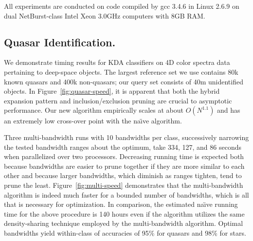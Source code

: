 \documentclass[twoside,leqno,twocolumn]{article}
\begin{document}
All experiments are conducted on code compiled by gcc 3.4.6 in Linux
2.6.9 on dual NetBurst-class Intel Xeon 3.0GHz computers with 8GB RAM.

\subsection{Quasar Identification.}
We demonstrate timing results for KDA classifiers on 4D color spectra
data pertaining to deep-space objects.  The largest reference set we
use contains 80k known quasars and 400k non-quasars; our query set
consists of 40m unidentified objects.  In
Figure~\ref{fig:quasar-speed}, it is apparent that both the hybrid
expansion pattern and inclusion/exclusion pruning are crucial to
asymptotic performance.  Our new algorithm empirically scales at about
$O(N^{1.1})$ and has an extremely low cross-over point with the
na\"{\i}ve algorithm.

Three multi-bandwidth runs with 10 bandwidths per class, successively
narrowing the tested bandwidth ranges about the optimum, take 334,
127, and 86 seconds when parallelized over two processors.  Decreasing
running time is expected both because bandwidths are easier to prune
together if they are more similar to each other and because larger
bandwidths, which diminish as ranges tighten, tend to prune the least.
Figure~\ref{fig:multi-speed} demonstrates that the multi-bandwidth
algorithm is indeed much faster for a bounded number of bandwidths,
which is all that is necessary for optimization.  In comparison, the
estimated na\"{\i}ve running time for the above procedure is 140 hours
even if the algorithm utilizes the same density-sharing technique
employed by the multi-bandwidth algorithm.  Optimal bandwidths yield
within-class of accuracies of 95\% for quasars and 98\% for stars.
\end{document}
